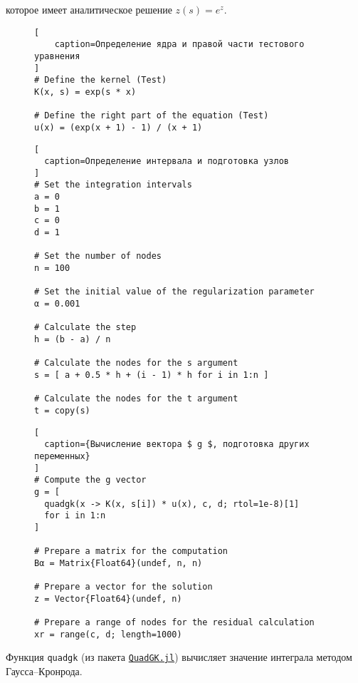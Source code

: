 которое имеет аналитическое решение $ z(s) = e^z $.

\newpage

\captionsetup{singlelinecheck=false, justification=justified}

\begin{figure}[h!]
\begin{lstlisting}[
    caption=Определение ядра и правой части тестового уравнения
]
# Define the kernel (Test)
K(x, s) = exp(s * x)

# Define the right part of the equation (Test)
u(x) = (exp(x + 1) - 1) / (x + 1)
\end{lstlisting}
\end{figure}

\begin{figure}[h!]
\begin{lstlisting}[
  caption=Определение интервала и подготовка узлов
]
# Set the integration intervals
a = 0
b = 1
c = 0
d = 1

# Set the number of nodes
n = 100

# Set the initial value of the regularization parameter
α = 0.001

# Calculate the step
h = (b - a) / n

# Calculate the nodes for the s argument
s = [ a + 0.5 * h + (i - 1) * h for i in 1:n ]

# Calculate the nodes for the t argument
t = copy(s)
\end{lstlisting}
\end{figure}

\begin{figure}[h!]
\begin{lstlisting}[
  caption={Вычисление вектора $ g $, подготовка других переменных}
]
# Compute the g vector
g = [
  quadgk(x -> K(x, s[i]) * u(x), c, d; rtol=1e-8)[1]
  for i in 1:n
]

# Prepare a matrix for the computation
Bα = Matrix{Float64}(undef, n, n)

# Prepare a vector for the solution
z = Vector{Float64}(undef, n)

# Prepare a range of nodes for the residual calculation
xr = range(c, d; length=1000)
\end{lstlisting}
\end{figure}

\newpage

Функция {\footnotesize \texttt{quadgk}} (из пакета \href{https://juliamath.github.io/QuadGK.jl/stable/}{\footnotesize \texttt{QuadGK.jl}}) вычисляет значение интеграла методом Гаусса--Кронрода. \npar

